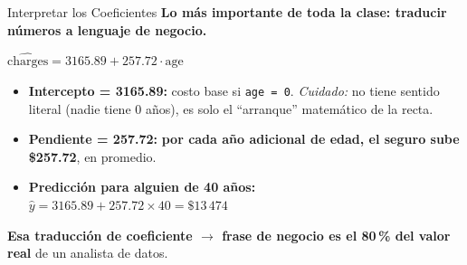 \documentclass[aspectratio=169, 11pt]{beamer}
\begin{document}
\begin{frame}[shrink=5]{Interpretar los Coeficientes}
  \vspace{-4pt}
  {\footnotesize\color{arcaDark}\bfseries
    Lo más importante de toda la clase: traducir números a lenguaje de negocio.}

  \vspace{6pt}
  \begin{center}
    \begin{tcolorbox}[colback=arcaGray, colframe=arcaRed, boxrule=1pt,
                      arc=4pt, width=0.85\textwidth]
    \centering
    \footnotesize
    $\hat{\text{charges}} = 3165.89 + 257.72 \cdot \text{age}$
    \end{tcolorbox}
  \end{center}

  \vspace{6pt}
  {\scriptsize
  \begin{itemize}\setlength{\itemsep}{6pt}
    \item[{\color{arcaRed}\faArrowRight}]
      \textbf{Intercepto = 3165.89:} costo base si \texttt{age = 0}.
      \textit{Cuidado:} no tiene sentido literal (nadie tiene 0 años),
      es solo el ``arranque'' matemático de la recta.
    \item[{\color{arcaRed}\faArrowRight}]
      \textbf{Pendiente = 257.72:} \textbf{por cada año adicional de
      edad, el seguro sube \$257.72}, en promedio.
    \item[{\color{arcaRed}\faArrowRight}]
      \textbf{Predicción para alguien de 40 años:}\\
      $\hat{y} = 3165.89 + 257.72 \times 40 = \$13\,474$
  \end{itemize}
  }

  \vspace{6pt}
  {\footnotesize\color{arcaDark}
    \faLightbulb\hspace{4pt}
    \textbf{Esa traducción de coeficiente $\to$ frase de negocio
    es el 80\,\% del valor real} de un analista de datos.}
\end{frame}
\end{document}

